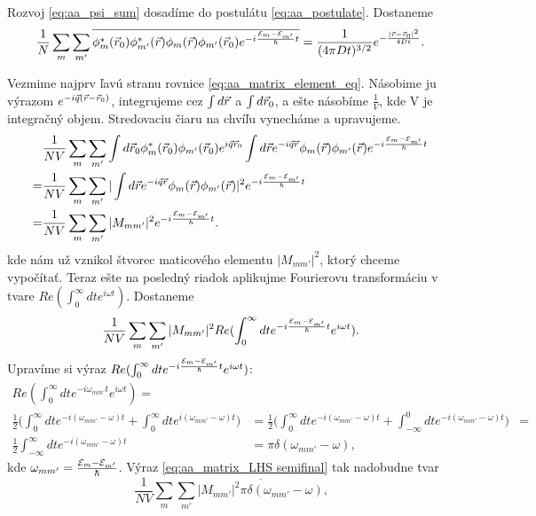 Rozvoj  \eqref{eq:aa_psi_sum} dosadíme do postulátu \eqref{eq:aa_postulate}. Dostaneme
\begin{equation}
 \label{eq:aa_matrix_element_eq}
 \frac{1}{N}\sum_m \sum_{m'} \overline{\phi_m^*(\vec{r}_0)\phi^*_{m'}(\vec{r})\phi_m(\vec{r})\phi_{m'}(\vec{r}_0)e^{-i\frac{\mathcal{E}_m-\mathcal{E}_{m'}}{\hbar}t}}=\frac{1}{(4\pi Dt)^{3/2}}e^{-\frac{|\vec{r}-\vec{r}_0|^2}{4Dt}}\text{.}
\end{equation}

Vezmime najprv ľavú stranu rovnice \eqref{eq:aa_matrix_element_eq}. Násobime ju výrazom $e^{-i\vec{q}(\vec{r}-\vec{r}_0)}$, integrujeme cez $\int d\vec{r}$ a $\int d\vec{r}_0$, a ešte násobíme $\frac{1}{V}$, kde V je integračný objem.
Stredovaciu čiaru na chvíľu vynecháme a upravujeme.
\begin{align*}
&\frac{1}{NV}\sum_m \sum_{m'} \int d\vec{r}_0  \phi_m^*(\vec{r}_0)\phi_{m'}(\vec{r}_0) e^{i\vec{q}\vec{r}_0} \int d\vec{r} e^{-i\vec{q}\vec{r}}\phi_m(\vec{r})\phi_{m'}(\vec{r})e^{-i\frac{\mathcal{E}_m-\mathcal{E}_{m'}}{\hbar}t} \\
=&\frac{1}{NV}\sum_m \sum_{m'}|\int d\vec{r} e^{-i\vec{q}\vec{r}}\phi_m(\vec{r})\phi_{m'}(\vec{r})|^2 e^{-i\frac{\mathcal{E}_m-\mathcal{E}_{m'}}{\hbar}t}\\
=&\frac{1}{NV}\sum_m \sum_{m'} |M_{mm'}|^2 e^{-i\frac{\mathcal{E}_m-\mathcal{E}_{m'}}{\hbar}t} \text{.}
\end{align*}
kde nám už vznikol štvorec maticového elementu $|M_{mm'}|^2$, ktorý chceme vypočítať. Teraz ešte na posledný riadok aplikujme Fourierovu transformáciu
v tvare $Re (\int_0^{\infty} dt e^{i\omega t})$. Dostaneme
\begin{equation}
 \label{eq:aa_matrix_LHS semifinal}
\frac{1}{NV}\sum_m \sum_{m'} |M_{mm'}|^2 Re (\int_0^{\infty} dt e^{-i\frac{\mathcal{E}_m-\mathcal{E}_{m'}}{\hbar}t} e^{i\omega t}) \text{.}
\end{equation}
Upravíme si výraz $Re(\int_0^{\infty} dt e^{-i\frac{\mathcal{E}_m-\mathcal{E}_{m'}}{\hbar}t} e^{i\omega t})$:
\begin{align*}
 Re(\int_0^{\infty} dt e^{-i\omega_{mm'}t} e^{i\omega t})=&\\
 \frac{1}{2} \bigl(\int_0^{\infty} dt e^{-i(\omega_{mm'}-\omega)t}+\int_0^{\infty} dt e^{i(\omega_{mm'}-\omega)t}\bigr)&=
  \frac{1}{2} \bigl(\int_0^{\infty} dt e^{-i(\omega_{mm'}-\omega)t}+\int_{-\infty}^{0} dt e^{-i(\omega_{mm'}-\omega)t}\bigr)&=\\
  \frac{1}{2} \int_{-\infty}^{\infty} dt e^{-i(\omega_{mm'}-\omega)t}&=\pi \delta(\omega_{mm'}-\omega)\text{,}
\end{align*}
kde $\omega_{mm'}=\frac{\mathcal{E}_m-\mathcal{E}_{m'}}{\hbar}$. Výraz  \eqref{eq:aa_matrix_LHS semifinal} tak nadobudne tvar
\begin{equation}
 \label{eq:aa_matrix_LHS}
 \frac{1}{NV}\sum_m \sum_{m'} \overline{|M_{mm'}|^2 \pi \delta(\omega_{mm'}-\omega)} \text{,}
\end{equation}
